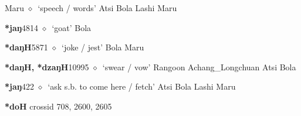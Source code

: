 \begin{list}{}{\leftmargin=1.5em \itemindent=-1.5em}
\hspace{1ex}
         Maru 
\hspace{1ex}
         $\diamond$~`speech / words'
         Atsi 
\hspace{1ex}
         Bola 
\hspace{1ex}
         Lashi 
\hspace{1ex}
         Maru 
  \item {\footnotesize \textbf{*jaŋ}}{\tiny 4814}
\hspace{1ex}
         $\diamond$~`goat'
         Bola 
  \item {\footnotesize \textbf{*daŋH}}{\tiny 5871}
\hspace{1ex}
         $\diamond$~`joke / jest'
         Bola 
\hspace{1ex}
         Maru 
  \item {\footnotesize \textbf{*daŋH, *dzaŋH}}{\tiny 10995}
\hspace{1ex}
         $\diamond$~`swear / vow'
         Rangoon 
\hspace{1ex}
         Achang\_Longchuan 
\hspace{1ex}
         Atsi 
\hspace{1ex}
         Bola 
  \item {\footnotesize \textbf{*jaŋ}}{\tiny 422}
\hspace{1ex}
         $\diamond$~`ask s.b. to come here / fetch'
         Atsi 
\hspace{1ex}
         Bola 
\hspace{1ex}
         Lashi 
\hspace{1ex}
         Maru 
  \end{list}
\item
\textbf{*doH}
  {\tiny crossid 708, 2600, 2605}

